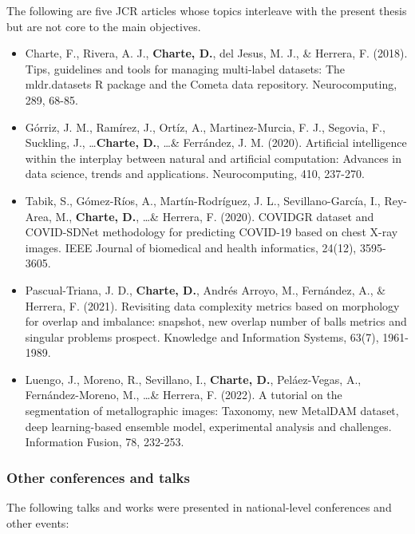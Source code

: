 The following are five JCR articles whose topics interleave with the present thesis but are not core to the main objectives. 

\begin{itemize}
    \item Charte, F., Rivera, A. J., \textbf{Charte, D.}, del Jesus, M. J., \& Herrera, F. (2018). Tips, guidelines and tools for managing multi-label datasets: The mldr.datasets R package and the Cometa data repository. Neurocomputing, 289, 68-85.
    \item Górriz, J. M., Ramírez, J., Ortíz, A., Martinez-Murcia, F. J., Segovia, F., Suckling, J., \dots \textbf{Charte, D.}, \dots \& Ferrández, J. M. (2020). Artificial intelligence within the interplay between natural and artificial computation: Advances in data science, trends and applications. Neurocomputing, 410, 237-270.
    \item Tabik, S., Gómez-Ríos, A., Martín-Rodríguez, J. L., Sevillano-García, I., Rey-Area, M., \textbf{Charte, D.}, \dots \& Herrera, F. (2020). COVIDGR dataset and COVID-SDNet methodology for predicting COVID-19 based on chest X-ray images. IEEE Journal of biomedical and health informatics, 24(12), 3595-3605.
    \item Pascual-Triana, J. D., \textbf{Charte, D.}, Andrés Arroyo, M., Fernández, A., \& Herrera, F. (2021). Revisiting data complexity metrics based on morphology for overlap and imbalance: snapshot, new overlap number of balls metrics and singular problems prospect. Knowledge and Information Systems, 63(7), 1961-1989.
    \item Luengo, J., Moreno, R., Sevillano, I., \textbf{Charte, D.}, Peláez-Vegas, A., Fernández-Moreno, M., \dots \& Herrera, F. (2022). A tutorial on the segmentation of metallographic images: Taxonomy, new MetalDAM dataset, deep learning-based ensemble model, experimental analysis and challenges. Information Fusion, 78, 232-253.
\end{itemize}

\subsubsection{Other conferences and talks}

The following talks and works were presented in national-level conferences and other events:

